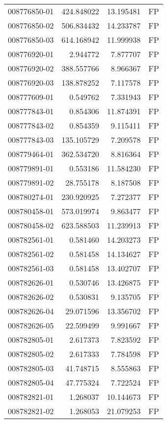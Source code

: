 \begin{tabular}{lrrl}
008776850-01 &  424.848022 &    13.195481 &   FP \\
008776850-02 &  506.834432 &    14.233787 &   FP \\
008776850-03 &  614.168942 &    11.999938 &   FP \\
008776920-01 &    2.944772 &     7.877707 &   FP \\
008776920-02 &  388.557766 &     8.966367 &   FP \\
008776920-03 &  138.878252 &     7.117578 &   FP \\
008777609-01 &    0.549762 &     7.331943 &   FP \\
008777843-01 &    0.854306 &    11.874391 &   FP \\
008777843-02 &    0.854359 &     9.115411 &   FP \\
008777843-03 &  135.105729 &     7.209578 &   FP \\
008779464-01 &  362.534720 &     8.816364 &   FP \\
008779891-01 &    0.553186 &    11.584230 &   FP \\
008779891-02 &   28.755178 &     8.187508 &   FP \\
008780274-01 &  230.920925 &     7.272377 &   FP \\
008780458-01 &  573.019974 &     9.863477 &   FP \\
008780458-02 &  623.588503 &    11.239913 &   FP \\
008782561-01 &    0.581460 &    14.203273 &   FP \\
008782561-02 &    0.581458 &    14.134627 &   FP \\
008782561-03 &    0.581458 &    13.402707 &   FP \\
008782626-01 &    0.530746 &    13.426875 &   FP \\
008782626-02 &    0.530831 &     9.135705 &   FP \\
008782626-04 &   29.071596 &    13.356702 &   FP \\
008782626-05 &   22.599499 &     9.991667 &   FP \\
008782805-01 &    2.617373 &     7.823592 &   FP \\
008782805-02 &    2.617333 &     7.784598 &   FP \\
008782805-03 &   41.748715 &     8.555863 &   FP \\
008782805-04 &   47.775324 &     7.722524 &   FP \\
008782821-01 &    1.268037 &    10.144673 &   FP \\
008782821-02 &    1.268053 &    21.079253 &   FP \\

\end{tabular}
